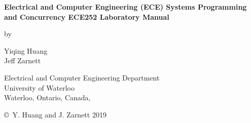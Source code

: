 \pagestyle{empty}

\begin{titlepage}
        \begin{center}
        \vspace*{1.0cm}

        \Huge
        {\bf Electrical and Computer Engineering (ECE) Systems Programming and Concurrency ECE252 Laboratory Manual}

        \vspace*{1.0cm}

        \normalsize
        by \\

        \vspace*{1.0cm}

        \Large
        Yiqing Huang \\
        Jeff Zarnett

        \vspace*{3.0cm}

        \normalsize
        Electrical and Computer Engineering Department \\
        University of Waterloo \\ 

        \vspace*{2.0cm}
\makeatletter
        Waterloo, Ontario, Canada, \@date \\
\makeatother
        
      
        
        \vspace*{1.0cm}

        \copyright\ Y. Huang and J. Zarnett 2019 \\
        \end{center}
\end{titlepage}

\pagestyle{plain}
\setcounter{page}{2}

\cleardoublepage %

